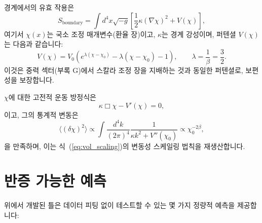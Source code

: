 \documentclass[12pt,a4paper]{article}
\theoremstyle{remark}
\begin{document}
	경계에서의 유효 작용은
	\begin{equation}
		S_{\mathrm{boundary}} = \int d^4x \sqrt{-g} \left[ \frac{1}{2} \kappa (\nabla \chi)^2 + V(\chi) \right],
		\label{eq:action}
	\end{equation}
	여기서 \(\chi(x)\)는 국소 조정 매개변수(환율 장)이고, \(\kappa\)는 경계 강성이며, 퍼텐셜 \(V(\chi)\)는 다음과 같습니다:
	\begin{equation}
		V(\chi) = V_0 \left( e^{\lambda(\chi - \chi_0)} - \lambda(\chi - \chi_0) - 1 \right), \qquad \lambda = \frac{1}{\beta} = \frac{3}{2}.
		\label{eq:potential}
	\end{equation}
	이것은 중력 섹터(부록 G)에서 스칼라 조정 장을 지배하는 것과 동일한 퍼텐셜로, 보편성을 보장합니다.
	
	\(\chi\)에 대한 고전적 운동 방정식은
	\begin{equation}
		\kappa \Box \chi - V'(\chi) = 0,
		\label{eq:eom}
	\end{equation}
	이고, 그의 통계적 변동은
	\begin{equation}
		\langle (\delta \chi)^2 \rangle \propto \int \frac{d^4k}{(2\pi)^4} \frac{1}{\kappa k^2 + V''(\chi_0)} \propto \chi_0^{-2\beta},
		\label{eq:fluctuations}
	\end{equation}
	을 만족하며, 이는 식~(\ref{eq:vol_scaling})의 변동성 스케일링 법칙을 재생산합니다.
	
	\section{반증 가능한 예측}
	
	위에서 개발된 틀은 데이터 피팅 없이 테스트할 수 있는 몇 가지 정량적 예측을 제공합니다:
	
\end{document}
